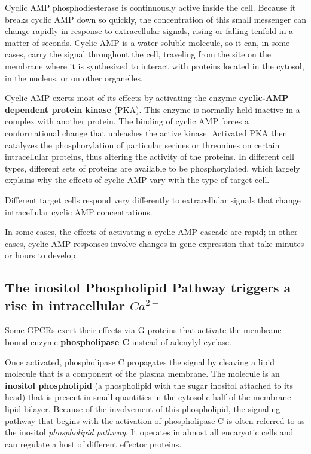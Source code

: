 Cyclic AMP phosphodiesterase is continuously active inside the cell.
Because it breaks cyclic AMP down so quickly, the concentration of this
small messenger can change rapidly in response to extracellular signals,
rising or falling tenfold in a matter of seconds. Cyclic AMP
is a water-soluble molecule, so it can, in some cases, carry the signal
throughout the cell, traveling from the site on the membrane where it is
synthesized to interact with proteins located in the cytosol, in the nucleus,
or on other organelles.

Cyclic AMP exerts most of its effects by activating the enzyme \textbf{cyclic-AMP–dependent protein kinase} 
(PKA). This enzyme is normally
held inactive in a complex with another protein. The binding of cyclic
AMP forces a conformational change that unleashes the active kinase.
Activated PKA then catalyzes the phosphorylation of particular serines or
threonines on certain intracellular proteins, thus altering the activity of
the proteins. In different cell types, different sets of proteins are available
to be phosphorylated, which largely explains why the effects of cyclic
AMP vary with the type of target cell.

Different target cells respond very differently to extracellular signals that 
change intracellular cyclic AMP concentrations.

In some cases, the effects of activating a cyclic AMP cascade are rapid;
in other cases, cyclic AMP responses involve changes in gene expression that take
minutes or hours to develop.

\subsection{The inositol Phospholipid Pathway triggers a rise in intracellular $Ca^{2+}$}

Some GPCRs exert their effects via G proteins that activate the membrane-bound 
enzyme \textbf{phospholipase C} instead of adenylyl cyclase.

Once activated, phospholipase C propagates the signal by cleaving a lipid
molecule that is a component of the plasma membrane. The molecule is
an \textbf{inositol phospholipid} (a phospholipid with the sugar inositol attached
to its head) that is present in small quantities in the cytosolic half of the
membrane lipid bilayer. Because of the involvement of
this phospholipid, the signaling pathway that begins with the activation
of phospholipase C is often referred to as the inositol \textit{phospholipid pathway}. 
It operates in almost all eucaryotic cells and can regulate a host of
different effector proteins.

